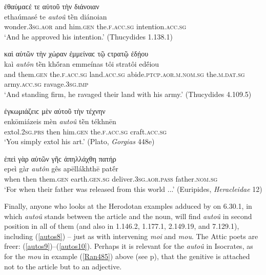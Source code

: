 \begin{exe}
\ex ἐθαύμαϲέ τε αὐτοῦ τὴν διάνοιαν\\
\gll ethaúmasé te \emph{autoû} tḕn diánoian\\
wonder.\textsc{3sg.aor} and him.\textsc{gen} the.\textsc{f.acc.sg} intention.\textsc{acc.sg}\\
\trans `And he approved his intention.' (Thucydides 1.138.1)
\label{autos4}
\end{exe}

\begin{exe}
\ex καὶ αὐτῶν τὴν χώραν ἐμμείναϲ τῷ ϲτρατῷ ἐδῄου\\
\gll kaì \emph{autôn} tḕn khṓran emmeínas tôi stratôi edḗiou\\
and them.\textsc{gen} the.\textsc{f.acc.sg} land.\textsc{acc.sg} abide.\textsc{ptcp.aor.m.nom.sg} the.\textsc{m.dat.sg} army.\textsc{acc.sg} ravage.\textsc{3sg.imp}\\
\trans `And standing firm, he ravaged their land with his army.' (Thucydides 4.109.5)
\label{autos5}
\end{exe}

\begin{exe}
\ex ἐγκωμιάζειϲ μὲν αὐτοῦ τὴν τέχνην\\
\gll enkōmiázeis mèn \emph{autoû} tḕn tékhnēn\\
extol.\textsc{2sg.prs} then him.\textsc{gen} the.\textsc{f.acc.sg} craft.\textsc{acc.sg}\\
\trans `You simply extol his art.' (Plato, \textit{Gorgias} 448e)
\label{autos6}
\end{exe}

\begin{exe}
\ex ἐπεὶ γὰρ αὐτῶν γῆϲ ἀπηλλάχθη πατήρ\\
\gll epeì gàr \emph{autôn} gês apēllákhthē patḗr\\
when then them.\textsc{gen} earth.\textsc{gen.sg} deliver.\textsc{3sg.aor.pass} father.\textsc{nom.sg}\\
\trans `For when their father was released from this world ...' (Euripides, \textit{Heracleidae} 12)
\label{autos7}
\end{exe}

Finally, anyone who looks at the Herodotan examples adduced by \citet[142]{Stein1866} on 6.30.1, in which \textit{autoû} stands between the article and the noun, will find \textit{autoû} in second position in all of them (and also in 1.146.2, 1.177.1, 2.149.19, and 7.129.1), including (\ref{autos8}) -- just as with intervening \textit{moi} and \textit{mou}. The Attic poets are freer: (\ref{autos9})--(\ref{autos10}). Perhaps it is relevant for the \textit{autoû} in Isocrates, as for the \textit{mou} in example (\ref{Ran485}) above (see p\pageref{Ran485}), that the genitive is attached not to the article but to an adjective.

